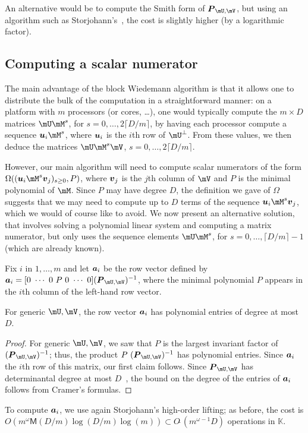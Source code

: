 \documentclass[12pt]{article}
\newcommand{\mat}[1]{\bm{\MakeUppercase{#1}}} %
\newcommand{\row}[1]{\bm{\MakeLowercase{#1}}} %
\newcommand{\col}[1]{\bm{\MakeLowercase{#1}}} %
\newcommand{\softO}[1]{O{\tilde{~}}(#1)} %
\newcommand{\minpoly}{P}
\def\M {\ensuremath{\mathsf{M}}}
\def\K{\mathbb{K}}
\def\K {\ensuremath{\mathbb{K}}}
\begin{document}
An alternative would be to compute the Smith form of
$\mat{P}_{\mU,\mV}$, but using an algorithm such as
Storjohann's~\cite{Stor03}, the cost is slightly higher (by a
logarithmic factor).


\subsection{Computing a scalar numerator}

The main advantage of the block Wiedemann algorithm is that it allows
one to distribute the bulk of the computation in a straightforward
manner: on a platform with $m$ processors (or cores, \dots), one would
typically compute the $m \times D$ matrices $\mU \mM^s$, for
$s=0,\dots,2\lceil D/m \rceil$, by having each processor compute a
sequence $\row{u}_i \mM^s$, where $\row{u}_i$ is the $i$th row of
$\mU^\perp$. From these values, we then deduce the matrices $\mU \mM^s
\mV$, $s=0,\dots,2\lceil D/m \rceil$.

However, our main algorithm will need to compute scalar numerators of
the form \sloppy $\Omega((\row{u}_i \mM^s \col{v}_j)_{s \ge 0},
\minpoly)$, where $\col{v}_j$ is the $j$th column of $\mV$ and
$\minpoly$ is the minimal polynomial of $\mM$. Since $\minpoly$ may
have degree $D$, the definition we gave of $\Omega$ suggests that we
may need to compute up to $D$ terms of the sequence $\row{u}_i \mM^s
\col{v}_j$, which we would of course like to avoid. We now present an
alternative solution, that involves solving a polynomial linear system
and computing a matrix numerator, but only uses the sequence elements
$\mU \mM^s$, for $s=0,\dots,\lceil D/m \rceil-1$ (which are already
known).

Fix $i$ in $1,\dots,m$ and let $\row{a}_i$ be the row vector defined
by $\row{a}_i = [0~\cdots~0~\minpoly~0~\cdots~0] (\mat{P}_{\mU,\mV})^{-1}$,
where the minimal polynomial $\minpoly$ appears in the $i$th column of the
left-hand row vector. 
\begin{lemma}\label{utilde}
  For generic $\mU,\mV$, the row vector $\row{a}_i$ has polynomial
  entries of degree at most~$D$.
\end{lemma}
\begin{proof}
  For generic $\mU,\mV$, we saw that $\minpoly$ is the largest
  invariant factor of $ (\mat{P}_{\mU,\mV})^{-1}$; thus, the product
  $\minpoly\ (\mat{P}_{\mU,\mV})^{-1}$ has polynomial entries. Since $\row{a}_i$ 
  the $i$th row of this matrix, our first claim follows. Since
  $\mat{P}_{\mU,\mV}$ has determinantal degree at most $D$~\cite{xxx}, the bound
  on the degree of the entries of $\row{a}_i$ follows from Cramer's
  formulas.
\end{proof}
To compute $\row{a}_i$, we use again Storjohann's high-order lifting;
as before, the cost is $O(m^{\omega} \M(D/m) \log(D/m) \log(m))
\subset \softO{m^{\omega-1}D}$ operations in $\K$.
\end{document}
